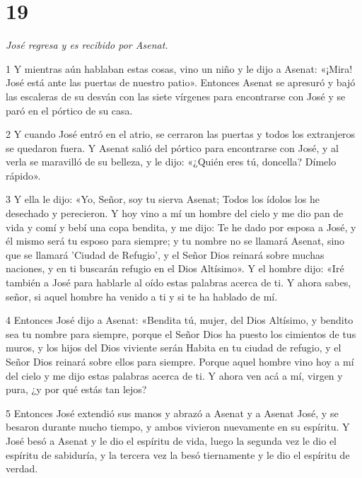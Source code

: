 \chapter{19}

\par \textit{José regresa y es recibido por Asenat.}

\par 1 Y mientras aún hablaban estas cosas, vino un niño y le dijo a Asenat: «¡Mira! José está ante las puertas de nuestro patio». Entonces Asenat se apresuró y bajó las escaleras de su desván con las siete vírgenes para encontrarse con José y se paró en el pórtico de su casa.

\par 2 Y cuando José entró en el atrio, se cerraron las puertas y todos los extranjeros se quedaron fuera. Y Asenat salió del pórtico para encontrarse con José, y al verla se maravilló de su belleza, y le dijo: «¿Quién eres tú, doncella? Dímelo rápido».

\par 3 Y ella le dijo: «Yo, Señor, soy tu sierva Asenat; Todos los ídolos los he desechado y perecieron. Y hoy vino a mí un hombre del cielo y me dio pan de vida y comí y bebí una copa bendita, y me dijo: Te he dado por esposa a José, y él mismo será tu esposo para siempre; y tu nombre no se llamará Asenat, sino que se llamará 'Ciudad de Refugio', y el Señor Dios reinará sobre muchas naciones, y en ti buscarán refugio en el Dios Altísimo». Y el hombre dijo: «Iré también a José para hablarle al oído estas palabras acerca de ti. Y ahora sabes, señor, si aquel hombre ha venido a ti y si te ha hablado de mí.

\par 4 Entonces José dijo a Asenat: «Bendita tú, mujer, del Dios Altísimo, y bendito sea tu nombre para siempre, porque el Señor Dios ha puesto los cimientos de tus muros, y los hijos del Dios viviente serán Habita en tu ciudad de refugio, y el Señor Dios reinará sobre ellos para siempre. Porque aquel hombre vino hoy a mí del cielo y me dijo estas palabras acerca de ti. Y ahora ven acá a mí, virgen y pura, ¿y por qué estás tan lejos?

\par 5 Entonces José extendió sus manos y abrazó a Asenat y a Asenat José, y se besaron durante mucho tiempo, y ambos vivieron nuevamente en su espíritu. Y José besó a Asenat y le dio el espíritu de vida, luego la segunda vez le dio el espíritu de sabiduría, y la tercera vez la besó tiernamente y le dio el espíritu de verdad.

